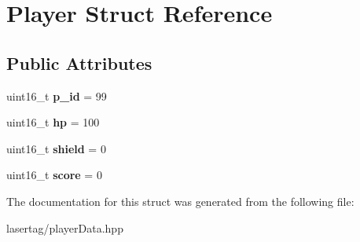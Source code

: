 \hypertarget{struct_player}{}\section{Player Struct Reference}
\label{struct_player}
\subsection*{Public Attributes}
\begin{DoxyCompactItemize}
\item 
\mbox{\label{struct_player_ae283754d5927f6442cd679e8b136e303}} 
uint16\+\_\+t {\bfseries p\+\_\+id} = 99
\item 
\mbox{\label{struct_player_a71d61d40d49f9f9172253c1fafd97ba2}} 
uint16\+\_\+t {\bfseries hp} = 100
\item 
\mbox{\label{struct_player_ad9cbb1b94a52f68782dd26b96eed169a}} 
uint16\+\_\+t {\bfseries shield} = 0
\item 
\mbox{\label{struct_player_a8f977208d1212bf7dbd7c590017d9eb4}} 
uint16\+\_\+t {\bfseries score} = 0
\end{DoxyCompactItemize}


The documentation for this struct was generated from the following file\+:\begin{DoxyCompactItemize}
\item 
lasertag/player\+Data.\+hpp\end{DoxyCompactItemize}
